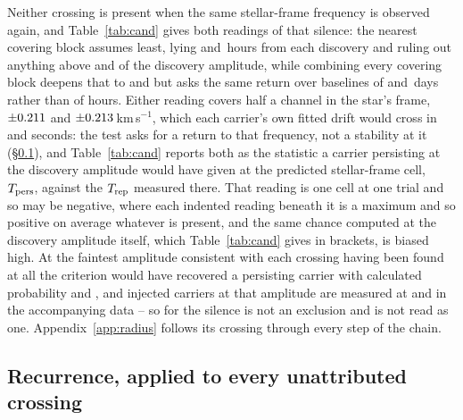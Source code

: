Neither crossing is present when the same stellar-frame frequency is observed
again, and Table~\ref{tab:cand} gives both readings of that silence: the
nearest covering block assumes least, lying \RcSxNearH{} and \EvBDeepH\,hours
from each discovery and ruling out anything above \RqNearFracSx{} and
\RqNearFracCp{} of the discovery amplitude, while combining every covering
block deepens that to \RcSxFive{} and \RcCpFive{} but asks the same return over
baselines of \RqSpanDSx{} and \RqSpanDCp\,days rather than of hours. Either
reading covers half a channel in the star's frame, $\pm0.211$ and
$\pm0.213$\,km\,s$^{-1}$, which each carrier's own fitted drift would cross
in \ZtSxLeaveSec{} and \ZtCpLeaveSec{} seconds: the test asks for a return to
that frequency, not a stability at it (\S\ref{sec:etacrv}), and
Table~\ref{tab:cand} reports both as the statistic a carrier persisting at the
discovery amplitude would have given at the predicted stellar-frame cell,
$T_{\rm pers}$, against the $T_{\rm rep}$ measured there. That reading is one
cell at one trial and so may be negative, where each indented reading beneath
it is a maximum and so positive on average whatever is present, and the same
chance computed at the discovery amplitude itself, which Table~\ref{tab:cand}
gives in brackets, is biased high. At the faintest amplitude consistent with
each crossing having been found at all the criterion would have recovered a
persisting carrier with calculated probability \RqPowerTrigSx{} and
\RqPowerTrigCp, and injected carriers at that amplitude are measured at
\HjMeasSx{} and \HjMeasCp{} in the accompanying data -- so for \EvBStar{} the
silence is not an exclusion and is not read as one. Appendix~\ref{app:radius}
follows its crossing through every step of the chain.


\subsection{Recurrence, applied to every unattributed crossing}
\label{sec:etacrv}

